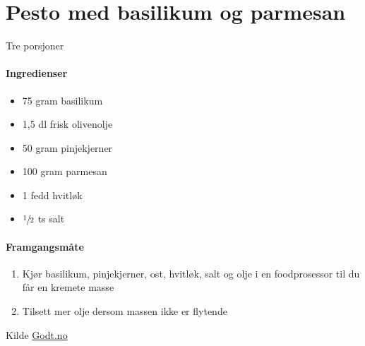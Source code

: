\section{﻿Pesto med basilikum og parmesan}
Tre porsjoner

\paragraph{Ingredienser}
\begin{itemize}[noitemsep]
	\item 75 gram basilikum
	\item 1,5 dl frisk olivenolje
	\item 50 gram pinjekjerner
	\item 100 gram parmesan
	\item 1 fedd hvitløk
	\item $\sfrac{1}{2}$ ts salt
\end{itemize}

\paragraph{Framgangsmåte}
\begin{enumerate}[noitemsep]
	\item Kjør basilikum, pinjekjerner, ost, hvitløk, salt og olje i en foodprosessor til du får en kremete masse
	\item Tilsett mer olje dersom massen ikke er flytende
\end{enumerate}

Kilde \href{http://www.godt.no/o2055}{Godt.no}

